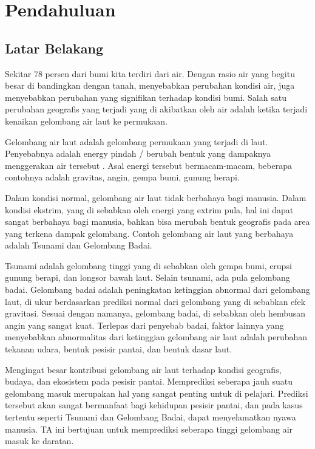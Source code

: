 \chapter{Pendahuluan}
\section{Latar Belakang}
    Sekitar 78 persen dari bumi kita terdiri dari air\cite{USGSEarthWater}. Dengan rasio air yang begitu besar di bandingkan dengan tanah, menyebabkan perubahan kondisi air, juga menyebabkan perubahan yang signifikan terhadap kondisi bumi. Salah satu perubahan geografis yang terjadi yang di akibatkan oleh air adalah ketika terjadi kenaikan gelombang air laut ke permukaan.
    
    Gelombang air laut adalah gelombang permukaan yang terjadi di laut. Penyebabnya adalah energy pindah / berubah bentuk yang dampaknya menggerakan air tersebut \cite{noaaWavesInOcean}. Asal energi tersebut bermacam-macam, beberapa contohnya adalah gravitas, angin, gempa bumi, gunung berapi.

    Dalam kondisi normal, gelombang air laut tidak berbahaya bagi manusia. Dalam kondisi ekstrim, yang di sebabkan oleh energi yang extrim pula, hal ini dapat sangat berbahaya bagi manusia, bahkan bisa merubah bentuk geografis pada area yang terkena dampak gelombang. Contoh gelombang air laut yang berbahaya adalah Tsunami dan Gelombang Badai.

    Tsunami adalah gelombang tinggi yang di sebabkan oleh gempa bumi, erupsi gunung berapi, dan longsor bawah laut. Selain tsunami, ada pula gelombang badai\cite{NOAATsunami}. Gelombang badai adalah peningkatan ketinggian abnormal dari gelombang laut, di ukur berdasarkan prediksi normal dari gelombang yang di sebabkan efek gravitasi. Sesuai dengan namanya, gelombang badai, di sebabkan oleh hembusan angin yang sangat kuat. Terlepas dari penyebab badai, faktor lainnya yang menyebabkan abnormalitas dari ketinggian gelombang air laut adalah perubahan tekanan udara, bentuk pesisir pantai, dan bentuk dasar laut.

    Mengingat besar kontribusi gelombang air laut terhadap kondisi geografis, budaya, dan ekosistem pada pesisir pantai. Memprediksi seberapa jauh suatu gelombang masuk merupakan hal yang sangat penting untuk di pelajari. Prediksi tersebut akan sangat bermanfaat bagi kehidupan pesisir pantai, dan pada kasus tertentu seperti Tsunami dan Gelombang Badai, dapat menyelamatkan nyawa manusia. TA ini bertujuan untuk memprediksi seberapa tinggi gelombang air masuk ke daratan. 

